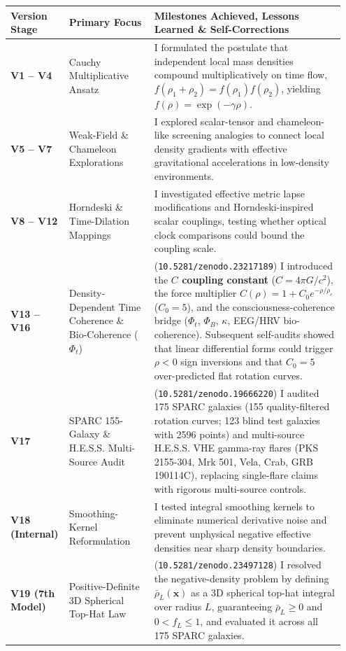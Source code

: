 \documentclass[10pt,a4paper]{article}
\begin{document}
\begin{center}\vspace{-2pt}
{\footnotesize
\begin{tabular}{@{}>{\raggedright\arraybackslash\bfseries\leavevmode\color{navy}}p{0.14\linewidth}>{\raggedright\arraybackslash}p{0.25\linewidth}>{\raggedright\arraybackslash}p{0.56\linewidth}@{}}
\toprule
Version Stage & Primary Focus & Milestones Achieved, Lessons Learned \& Self-Corrections \\
\midrule
V1 -- V4 & Cauchy Multiplicative Ansatz & I formulated the postulate that independent local mass densities compound multiplicatively on time flow, $f(\rho_1+\rho_2)=f(\rho_1)f(\rho_2)$, yielding $f(\rho)=\exp(-\gamma\rho)$. \\
V5 -- V7 & Weak-Field \& Chameleon Explorations & I explored scalar-tensor and chameleon-like screening analogies to connect local density gradients with effective gravitational accelerations in low-density environments. \\
V8 -- V12 & Horndeski \& Time-Dilation Mappings & I investigated effective metric lapse modifications and Horndeski-inspired scalar couplings, testing whether optical clock comparisons could bound the coupling scale. \\
V13 -- V16 & Density-Dependent Time Coherence \& Bio-Coherence ($\Phi_t$) & (\texttt{10.5281/zenodo.23217189}) I introduced the \textbf{$C$ coupling constant} ($C=4\pi G/c^2$), the force multiplier $C(\rho)=1+C_0 e^{-\rho/\rho_c}$ ($C_0=5$), and the consciousness-coherence bridge ($\Phi_t$, $\Phi_B$, $\kappa$, EEG/HRV bio-coherence). Subsequent self-audits showed that linear differential forms could trigger $\rho<0$ sign inversions and that $C_0=5$ over-predicted flat rotation curves. \\
V17 & SPARC 155-Galaxy \& H.E.S.S. Multi-Source Audit & (\texttt{10.5281/zenodo.19666220}) I audited 175 SPARC galaxies (155 quality-filtered rotation curves; 123 blind test galaxies with 2596 points) and multi-source H.E.S.S. VHE gamma-ray flares (PKS 2155-304, Mrk 501, Vela, Crab, GRB 190114C), replacing single-flare claims with rigorous multi-source controls. \\
V18 (Internal) & Smoothing-Kernel Reformulation & I tested integral smoothing kernels to eliminate numerical derivative noise and prevent unphysical negative effective densities near sharp density boundaries. \\
V19 (7th Model) & Positive-Definite 3D Spherical Top-Hat Law & (\texttt{10.5281/zenodo.23497128}) I resolved the negative-density problem by defining $\bar{\rho}_L(\mathbf{x})$ as a 3D spherical top-hat integral over radius $L$, guaranteeing $\bar{\rho}_L\ge 0$ and $0<f_L\le 1$, and evaluated it across all 175 SPARC galaxies. \\

\end{tabular}}
\end{center}
\end{document}

